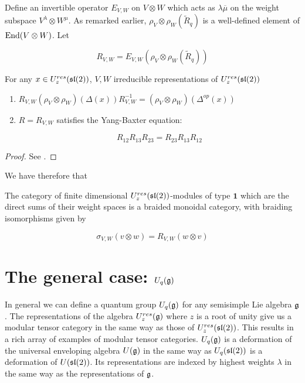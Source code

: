 Define an invertible operator $E_{V,W}$ on $V \otimes W$ which acts as
$\lambda\overline{\mu}$ on the weight subspace $V^\lambda \otimes W^\mu$. As remarked
earlier, $\rho_V \otimes \rho_W (\tilde{R}_q) $ is a well-defined element of
$\operatorname{End}(V \otimes W)$. Let 

\begin{equation}
R_{V,W} = E_{V,W} \left(\rho_V \otimes \rho_W (\tilde{R}_q)\right)
\end{equation}

\begin{claim}
For any $x \in U_z^{res}(\mathfrak{sl}(2))$, $V,W$ irreducible representations of $U_z^{res}(\mathfrak{sl}(2))$
\begin{enumerate}
\item $R_{V,W} (\rho_V \otimes \rho_W) (\Delta(x)) R^{-1}_{V,W} = (\rho_{V} \otimes \rho_W)(\Delta^{op}(x))$
\item $R=R_{V,W}$  satisfies the Yang-Baxter equation: 

\begin{equation}
R_{12} R_{13} R_{23} = R_{23} R_{13} R_{12}
\end{equation}
\end{enumerate}
\end{claim}
\begin{proof}
    See \cite{CP}.
\end{proof}

We have therefore that 

\begin{theorem}
\label{theorem:Braiding}
The category of finite dimensional $U_z^{res}(\mathfrak{sl}(2))$-modules of type
$\mathbf{1}$ which are the direct sums of their weight spaces is a braided
monoidal category, with braiding isomorphisms given by 

\begin{equation}
\sigma_{V,W}(v \otimes w) = R_{V,W}(w \otimes v)
\end{equation}
\end{theorem}


\section{The general case: $U_q(\mathfrak{g})$}
\label{section:U_q(g)}


In general we can define a quantum group $U_q(\mathfrak{g})$ for any semisimple Lie
algebra $\mathfrak{g}$. The representations of the algebra $U_z^{res}(\mathfrak{g})$
where $z$ is a root of unity give us a modular tensor category in the same way
as those of $U_z^{res}(\mathfrak{sl}(2))$. This results in a rich array of examples of
modular tensor categories. $U_q(\mathfrak{g})$ is a deformation of the
universal enveloping algebra $U(\mathfrak{g})$ in the same way as $U_q(\mathfrak{sl}(2))$ is a
deformation of $U(\mathfrak{sl}(2))$. Its representations are indexed by highest weights
$\lambda$ in the same way as the representations of $\mathfrak{g}$. 

